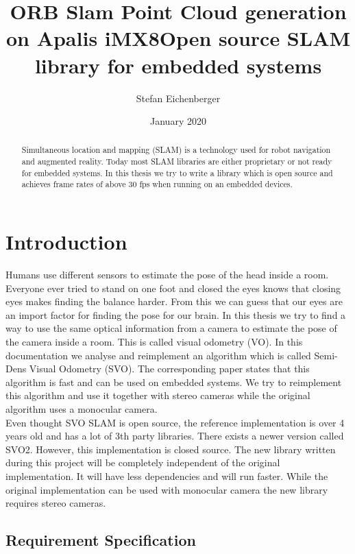 \documentclass[11pt,a4paper,titlepage,oneside]{report}
\title{ORB Slam Point Cloud generation on Apalis iMX8}
\author{Stefan Eichenberger}
\date{January 2020}
\begin{document}
\title{Open source SLAM library for embedded systems}

\maketitle
\begin{abstract}
  Simultaneous location and mapping (SLAM) is a technology used for robot navigation and augmented reality. Today most SLAM libraries are either proprietary or not ready for embedded systems. In this thesis we try to write a library which is open source and achieves frame rates of above 30 fps when running on an embedded devices.
\end{abstract}

\tableofcontents

\chapter{Introduction}

Humans use different sensors to estimate the pose of the head inside a room. Everyone ever tried to stand on one foot and closed the eyes knows that closing eyes makes finding the balance harder. From this we can guess that our eyes are an import factor for finding the pose for our brain. In this thesis we try to find a way to use the same optical information from a camera to estimate the pose of the camera inside a room. This is called visual odometry (VO). In this documentation we analyse and reimplement an algorithm which is called Semi-Dens Visual Odometry (SVO). The corresponding paper states that this algorithm is fast and can be used on embedded systems. We try to reimplement this algorithm and use it together with stereo cameras while the original algorithm uses a monocular camera.\\
Even thought SVO SLAM is open source, the reference implementation is over 4 years old and has a lot of 3th party libraries. There exists a newer version called SVO2. However, this implementation is closed source. The new library written during this project will be completely independent of the original implementation. It will have less dependencies and will run faster. While the original implementation can be used with monocular camera the new library requires stereo cameras.

\section{Requirement Specification}
\end{document}
